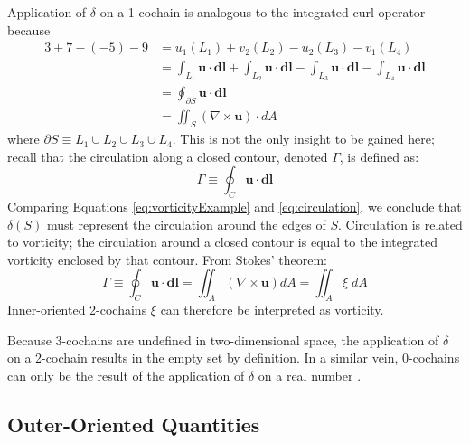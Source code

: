 Application of $\delta$ on a 1-cochain is analogous to the integrated curl operator because\begin{equation}
    \begin{split}
        3 + 7 - (-5) - 9 &= u_1(L_1) + v_2(L_2) - u_2(L_3) - v_1(L_4) \\
        &= \int_{L_1} \mathbf{u} \cdot \mathbf{dl} + \int_{L_2} \mathbf{u} \cdot \mathbf{dl} - \int_{L_3} \mathbf{u} \cdot \mathbf{dl} - \int_{L_4} \mathbf{u} \cdot \mathbf{dl} \\
        &= \oint_{\partial S} \mathbf{u} \cdot \mathbf{dl} \\
        &= \iint_{S} \left( \nabla \times \mathbf{u} \right) \cdot dA
    \end{split}
    \label{eq:vorticityExample}
\end{equation}
where $\partial S \equiv L_1 \cup L_2 \cup L_3 \cup L_4$. This is not the only insight to be gained here; recall that the circulation along a closed contour, denoted $\Gamma$, is defined as:
\begin{equation}
    \Gamma \equiv \oint_C \mathbf{u} \cdot \mathbf{dl}
    \label{eq:circulation}
\end{equation}
Comparing Equations \eqref{eq:vorticityExample} and \eqref{eq:circulation}, we conclude that $\delta(S)$ must represent the circulation around the edges of $S$. Circulation is related to vorticity; the circulation around a closed contour is equal to the integrated vorticity enclosed by that contour. From Stokes' theorem:
\begin{equation}
    \Gamma \equiv \oint_C \mathbf{u} \cdot \mathbf{dl} = \iint_A \left( \nabla \times \mathbf{u} \right) dA = \iint_A \xi \; dA
\end{equation}
Inner-oriented 2-cochains $\xi$ can therefore be interpreted as vorticity.

Because $3$-cochains are undefined in two-dimensional space, the application of $\delta$ on a 2-cochain results in the empty set by definition. In a similar vein, 0-cochains can only be the result of the application of $\delta$ on a real number \parencite{hirani2003discrete}.

\subsection{Outer-Oriented Quantities}


